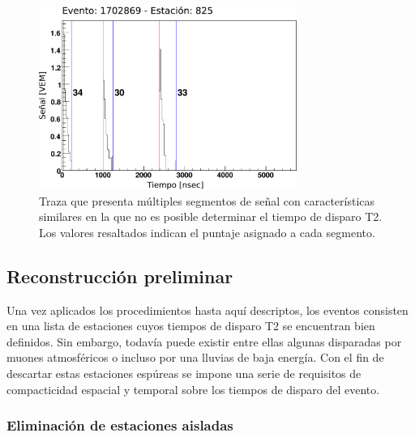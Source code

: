 		\begin{figure}[ht]
			\begin{center}
			\includegraphics[width=0.75\textwidth]{fig/seleccionAuger/multipicos.pdf}
			\caption{Traza que presenta múltiples segmentos de señal con características similares en la que no es posible determinar el tiempo de disparo T2. Los valores resaltados indican el puntaje asignado a cada segmento.}
			\label{fig:multipicos}
			\end{center}
		\end{figure}
		
		
	\subsection{Reconstrucción preliminar}
	
	Una vez aplicados los procedimientos hasta aquí descriptos, los eventos consisten en una lista de estaciones cuyos tiempos de disparo T2 se encuentran bien definidos.
	Sin embargo, todav\'ia puede existir entre ellas algunas disparadas por muones atmosféricos o incluso por una lluvias de baja energía.
	Con el fin de descartar estas estaciones espúreas se impone una serie de requisitos de compacticidad espacial y temporal sobre los tiempos de disparo del evento.
	
	\subsubsection{Eliminación de estaciones aisladas} 
	
